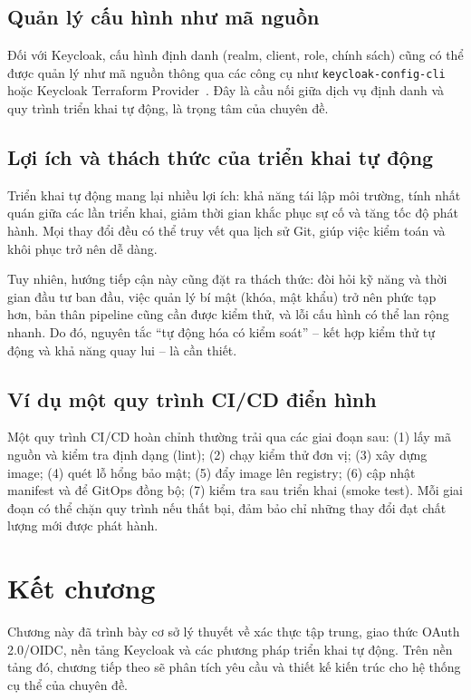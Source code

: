 \subsection{Quản lý cấu hình như mã nguồn}

Đối với Keycloak, cấu hình định danh (realm, client, role, chính sách) cũng có
thể được quản lý như mã nguồn thông qua các công cụ như
\texttt{keycloak-config-cli}~\cite{kc-config-cli} hoặc Keycloak Terraform
Provider~\cite{tf-keycloak}. Đây là cầu nối giữa dịch vụ định danh và quy
trình triển khai tự động, là trọng tâm của chuyên đề.

\subsection{Lợi ích và thách thức của triển khai tự động}
\label{subsec:auto-tradeoff}

Triển khai tự động mang lại nhiều lợi ích: khả năng tái lập môi trường, tính
nhất quán giữa các lần triển khai, giảm thời gian khắc phục sự cố và tăng tốc
độ phát hành. Mọi thay đổi đều có thể truy vết qua lịch sử Git, giúp việc kiểm
toán và khôi phục trở nên dễ dàng.

Tuy nhiên, hướng tiếp cận này cũng đặt ra thách thức: đòi hỏi kỹ năng và thời
gian đầu tư ban đầu, việc quản lý bí mật (khóa, mật khẩu) trở nên phức tạp hơn,
bản thân pipeline cũng cần được kiểm thử, và lỗi cấu hình có thể lan rộng
nhanh. Do đó, nguyên tắc ``tự động hóa có kiểm soát'' -- kết hợp kiểm thử tự
động và khả năng quay lui -- là cần thiết.

\subsection{Ví dụ một quy trình CI/CD điển hình}
\label{subsec:pipeline}

Một quy trình CI/CD hoàn chỉnh thường trải qua các giai đoạn sau: (1) lấy mã
nguồn và kiểm tra định dạng (lint); (2) chạy kiểm thử đơn vị; (3) xây dựng
image; (4) quét lỗ hổng bảo mật; (5) đẩy image lên registry; (6) cập nhật
manifest và để GitOps đồng bộ; (7) kiểm tra sau triển khai (smoke test). Mỗi
giai đoạn có thể chặn quy trình nếu thất bại, đảm bảo chỉ những thay đổi đạt
chất lượng mới được phát hành.

\section{Kết chương}

Chương này đã trình bày cơ sở lý thuyết về xác thực tập trung, giao thức
OAuth 2.0/OIDC, nền tảng Keycloak và các phương pháp triển khai tự động. Trên
nền tảng đó, chương tiếp theo sẽ phân tích yêu cầu và thiết kế kiến trúc cho
hệ thống cụ thể của chuyên đề.

